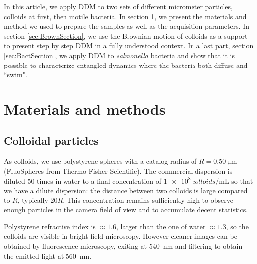 \documentclass[%
 aip,
 jmp,%
 amsmath,amssymb,
reprint,%
]{revtex4-1}
\begin{document}
In this article, we apply DDM to two sets of different micrometer particles, colloids at first, then motile bacteria. In section \ref{materials}, we present the materials and method we used to prepare the samples as well as the acquisition parameters. In section \ref{sec:BrownSection}, we use the Brownian motion of colloids as a support to present step by step DDM in a fully understood context. In a last part, section \ref{sec:BactSection}, we apply DDM to \textit{salmonella} bacteria and show that it is possible to characterize entangled dynamics where the bacteria both diffuse and ``swim".

\section{Materials and methods}
\label{materials}
\subsection{Colloidal particles}

As colloids, we use polystyrene spheres with a catalog radius of $R=\SI{0.50}{\micro\meter}$  (FluoSpheres\circledR{} from Thermo Fisher Scientific). The commercial dispersion is diluted 50 times in water to a final concentration of $\SI{1e8}{colloids\per\milli\liter}$ so that we have a dilute dispersion: the distance between two colloids is large compared to $R$, typically $20 R$. This concentration remains sufficiently high to observe enough particles in the camera field of view and to accumulate decent statistics.

Polystyrene refractive index is $\approx 1.6$, larger than the one of water $\approx 1.3$, so the colloids are visible in bright field microscopy. However cleaner images can be obtained by fluorescence microscopy, exiting at \SI{540}{\nano\metre} and filtering to obtain the emitted light at \SI{560}{\nano\metre}.
\end{document}
